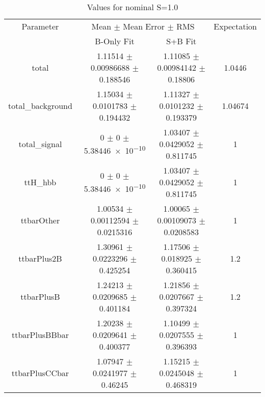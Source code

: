 \begin{table}
\centering
\caption{Values for nominal S=1.0}
\begin{tabular}{cccc}
\toprule
Parameter & \multicolumn{2}{c}{Mean $\pm$ Mean Error $\pm$ RMS} & Expectation\\
 & B-Only Fit & S+B Fit & \\
\midrule
total & \num{1.11514} $\pm$ \num{0.00986688} $\pm$ \num{0.188546} & \num{1.11085} $\pm$ \num{0.00984142} $\pm$ \num{0.18806} & \num{1.0446}\\
total\_background & \num{1.15034} $\pm$ \num{0.0101783} $\pm$ \num{0.194432} & \num{1.11327} $\pm$ \num{0.0101232} $\pm$ \num{0.193379} & \num{1.04674}\\
total\_signal & \num{0} $\pm$ \num{0} $\pm$ \num{5.38446e-10} & \num{1.03407} $\pm$ \num{0.0429052} $\pm$ \num{0.811745} & \num{1}\\
ttH\_hbb & \num{0} $\pm$ \num{0} $\pm$ \num{5.38446e-10} & \num{1.03407} $\pm$ \num{0.0429052} $\pm$ \num{0.811745} & \num{1}\\
ttbarOther & \num{1.00534} $\pm$ \num{0.00112594} $\pm$ \num{0.0215316} & \num{1.00065} $\pm$ \num{0.00109073} $\pm$ \num{0.0208583} & \num{1}\\
ttbarPlus2B & \num{1.30961} $\pm$ \num{0.0223296} $\pm$ \num{0.425254} & \num{1.17506} $\pm$ \num{0.018925} $\pm$ \num{0.360415} & \num{1.2}\\
ttbarPlusB & \num{1.24213} $\pm$ \num{0.0209685} $\pm$ \num{0.401184} & \num{1.21856} $\pm$ \num{0.0207667} $\pm$ \num{0.397324} & \num{1.2}\\
ttbarPlusBBbar & \num{1.20238} $\pm$ \num{0.0209641} $\pm$ \num{0.400377} & \num{1.10499} $\pm$ \num{0.0207555} $\pm$ \num{0.396393} & \num{1}\\
ttbarPlusCCbar & \num{1.07947} $\pm$ \num{0.0241977} $\pm$ \num{0.46245} & \num{1.15215} $\pm$ \num{0.0245048} $\pm$ \num{0.468319} & \num{1}\\
\bottomrule
\end{tabular}
\end{table}